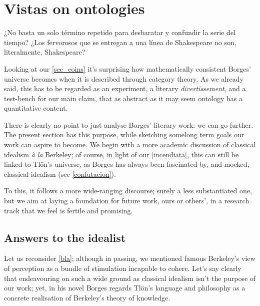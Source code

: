 \section{Vistas on ontologies}\label{vistas}
\epigraph{¿No basta un solo término repetido para desbaratar y confundir la serie del tiempo? ¿Los fervorosos que se entregan a una línea de Shakespeare no son, literalmente, Shakespeare?}{\cite{confutacion}}
Looking at our \autoref{sec_coins} it's surprising how mathematically consistent Borges' universe becomes when it is described through category theory. As we already said, this has to be regarded as an experiment, a literary \emph{divertissement}, and a test-bench for our main claim, that as abstract as it may seem ontology has a quantitative content.

There is clearly no point to just analyse Borges' literary work: we can go further. The present section has this purpose, while sketching somelong term goals our work can aspire to become. We begin with a more academic discussion of classical idealism \emph{à la} Berkeley; of course, in light of our \autoref{incendiata}, this can still be linked to Tl\"on's universe, as Borges has always been fascinated by, and mocked, classical idealism (see \autoref{confutacion}).

To this, it follows a more wide-ranging discourse; surely a less substantiated one, but we aim at laying a foundation for future work, ours or others', in a research track that we feel is fertile and promising.
\subsection{Answers to the idealist}\label{berkelei}
Let us reconsider \autoref{bla}; although in passing, we mentioned famous Berkeley's view of perception as a bundle of stimulation incapable to cohere. Let's say clearly that endeavouring on such a wide ground as classical idealism isn't the purpose of our work; yet, in his novel Borges regards Tl\"on's language and philosophy as a concrete realisation of Berkeley's theory of knowledge.

